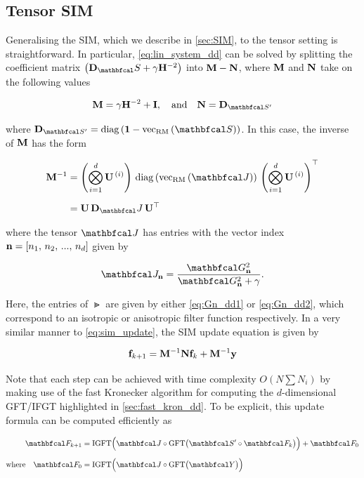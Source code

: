 \subsection{Tensor SIM}

\label{sec:SIM_dd}

Generalising the SIM, which we describe in \cref{sec:SIM}, to the tensor setting is straightforward. In particular, \cref{eq:lin_system_dd} can be solved by splitting the coefficient matrix $\left(\D_\St + \gamma \HH^{-2}\right)$ into $\mathbf{M} - \mathbf{N}$, where $\mathbf{M}$ and $\mathbf{N}$ take on the following values
 
\begin{equation}
    \M = \gamma \HH^{-2} + \I, \aand \N = \D_{\St'}
\end{equation}

where $\D_{\St'} = \diag{\mathbf{1} - \vecrm{\St}}$. In this case, the inverse of $\mathbf{M}$ has the form 


\begin{align}
\M^{-1} &= \left( \bigotimes_{i=1}^d  \U^{\,(i)} \right) \, \diag{\vecrm{\Jt}}\, \left(\bigotimes_{i=1}^d  \U^{\,(i)} \right)^\top \notag \\[0.2cm]
&= \U \, \D_\Jt \, \U^\top
\end{align}

where the tensor $\Jt$ has entries with the vector index $\mathbf{n} = [n_1,\, n_2,\, ...,\, n_d]$ given by 

\begin{equation}
    \Jt_{\nn} = \frac{\Gt_{\nn}^2}{\Gt_{\nn}^2 + \gamma}.
\end{equation}

Here, the entries of $\Gt$ are given by either \cref{eq:Gn_dd1} or \cref{eq:Gn_dd2}, which correspond to an isotropic or anisotropic filter function respectively. In a very similar manner to \cref{eq:sim_update}, the SIM update equation is given by 

\begin{equation}
    \label{eq:sim_update_dd}
    \mathbf{f}_{k+1} = \mathbf{M}^{-1}\mathbf{N} \mathbf{f}_{k} + \mathbf{M}^{-1} \mathbf{y}
\end{equation}

Note that each step can be achieved with time complexity $O(N \sum N_i)$ by making use of the fast Kronecker algorithm for computing the $d$-dimensional GFT/IFGT highlighted in \cref{sec:fast_kron_dd}. To be explicit, this update formula can be computed efficiently as 

\begin{align*}
    \Ft_{k+1} &= \text{IGFT} \Big( \Jt \circ \text{GFT}\big(\St' \circ \Ft_{k}\big)\Big)  + \Ft_{0} \\[0.2cm]
    \text{where} \quad \Ft_{0} &= \text{IGFT} \Big( \Jt \circ \text{GFT}\big(\Yt \big)\Big) 
\end{align*}

